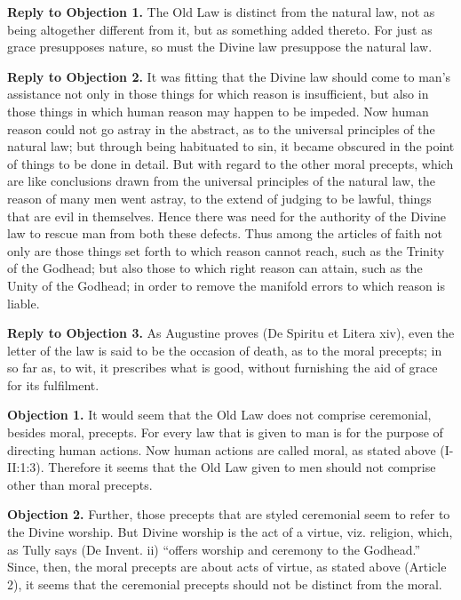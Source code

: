 \textbf{Reply to Objection 1.} The Old Law is distinct from the natural law, not as being altogether different from it, but as something added thereto. For just as grace presupposes nature, so must the Divine law presuppose the natural law.

\textbf{Reply to Objection 2.} It was fitting that the Divine law should come to man's assistance not only in those things for which reason is insufficient, but also in those things in which human reason may happen to be impeded. Now human reason could not go astray in the abstract, as to the universal principles of the natural law; but through being habituated to sin, it became obscured in the point of things to be done in detail. But with regard to the other moral precepts, which are like conclusions drawn from the universal principles of the natural law, the reason of many men went astray, to the extend of judging to be lawful, things that are evil in themselves. Hence there was need for the authority of the Divine law to rescue man from both these defects. Thus among the articles of faith not only are those things set forth to which reason cannot reach, such as the Trinity of the Godhead; but also those to which right reason can attain, such as the Unity of the Godhead; in order to remove the manifold errors to which reason is liable.

\textbf{Reply to Objection 3.} As Augustine proves (De Spiritu et Litera xiv), even the letter of the law is said to be the occasion of death, as to the moral precepts; in so far as, to wit, it prescribes what is good, without furnishing the aid of grace for its fulfilment.


\textbf{Objection 1.} It would seem that the Old Law does not comprise ceremonial, besides moral, precepts. For every law that is given to man is for the purpose of directing human actions. Now human actions are called moral, as stated above (I-II:1:3). Therefore it seems that the Old Law given to men should not comprise other than moral precepts.

\textbf{Objection 2.} Further, those precepts that are styled ceremonial seem to refer to the Divine worship. But Divine worship is the act of a virtue, viz. religion, which, as Tully says (De Invent. ii) ``offers worship and ceremony to the Godhead.'' Since, then, the moral precepts are about acts of virtue, as stated above (Article 2), it seems that the ceremonial precepts should not be distinct from the moral.

